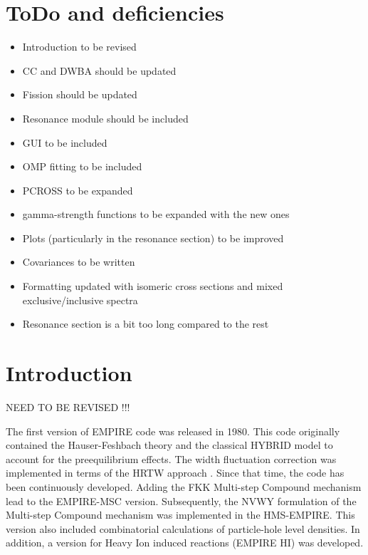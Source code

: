 \documentclass[twocolumn,amsmath,amssymb,10pt,groupedaddress,a4paper]{revtex4}
\begin{document}
\maketitle
{}
\lfoot{}
\rfoot{}
\setlength{\headrulewidth}{0.4pt}
\setlength{\footrulewidth}{0.4pt}

\newpage
\tableofcontents



\newpage
\section{ToDo and deficiencies}

\begin{itemize}
\item Introduction to be revised
\item CC and DWBA should be updated
\item Fission should be updated
\item Resonance module should be included
\item GUI to be included
\item OMP fitting to be included
\item PCROSS to be expanded
\item gamma-strength functions to be expanded with the new ones
\item Plots (particularly in the resonance section) to be improved
\item Covariances to be written
\item Formatting updated with isomeric cross sections and mixed exclusive/inclusive spectra
\item Resonance section is a bit too long compared to the rest
\end{itemize}

\section{Introduction}
NEED TO BE REVISED !!!

The first version of EMPIRE code was released in 1980. This code originally
contained the Hauser-Feshbach theory and the
classical HYBRID model to account for the preequilibrium
effects. The width fluctuation correction was implemented in terms
of the HRTW approach \cite{HRTW,HHM}. Since that time, the code has
been continuously developed. Adding the FKK Multi-step Compound
mechanism \cite{FKK} lead to the EMPIRE-MSC version. Subsequently,
the NVWY formulation of the Multi-step Compound mechanism
\cite{NVWY} was implemented in the HMS-EMPIRE. This version also
included combinatorial calculations of particle-hole level densities.
In addition, a version for Heavy Ion induced reactions (EMPIRE HI)
was developed.
\end{document}
